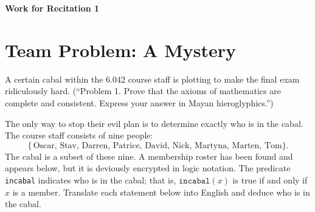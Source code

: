 \documentclass[11pt,fleqn]{article}
\begin{document}
\thispagestyle{firstpage}

\vspace*{1cm} %

\begin{center}
  \Large \textbf{Work for Recitation 1}
\end{center}

\vspace{1cm} %

\section{Team Problem: A Mystery}

A certain cabal within the 6.042 course staff is plotting to make the final exam ridiculously hard. (``Problem 1. Prove that the axioms of mathematics are complete and consistent. Express your answer in Mayan hieroglyphics.'')

The only way to stop their evil plan is to determine exactly who is in the cabal. The course staff consists of nine people:
\[
\{\,\text{Oscar},\, \text{Stav},\, \text{Darren},\, \text{Patrice},\, \text{David},\, \text{Nick},\, \text{Martyna},\, \text{Marten},\, \text{Tom}\}.
\]
The cabal is a subset of these nine. A membership roster has been found and appears below, but it is deviously encrypted in logic notation. The predicate \texttt{incabal} indicates who is in the cabal; that is, \(\texttt{incabal}(x)\) is true if and only if \(x\) is a member. Translate each statement below into English and deduce who is in the cabal.
\end{document}
